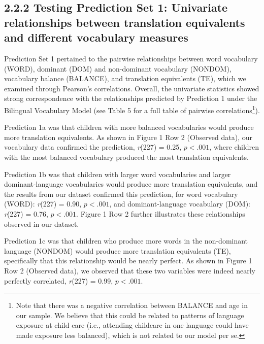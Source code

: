 \documentclass[
  english,
  ,man,floatsintext]{apa6}
\begin{document}
\hypertarget{testing-prediction-set-1-univariate-relationships-between-translation-equivalents-and-different-vocabulary-measures}{%
\subsection{2.2.2 Testing Prediction Set 1: Univariate relationships between translation equivalents and different vocabulary measures}\label{testing-prediction-set-1-univariate-relationships-between-translation-equivalents-and-different-vocabulary-measures}}

Prediction Set 1 pertained to the pairwise relationships between word vocabulary (WORD), dominant (DOM) and non-dominant vocabulary (NONDOM), vocabulary balance (BALANCE), and translation equivalents (TE), which we examined through Pearson's correlations. Overall, the univariate statistics showed strong correspondence with the relationships predicted by Prediction 1 under the Bilingual Vocabulary Model (see Table 5 for a full table of pairwise correlations\footnote{Note that there was a negative correlation between BALANCE and age in our sample. We believe that this could be related to patterns of language exposure at child care (i.e., attending childcare in one language could have made exposure less balanced), which is not related to our model per se.}).

Prediction 1a was that children with more balanced vocabularies would produce more translation equivalents. As shown in Figure 1 Row 2 (Observed data), our vocabulary data confirmed the prediction, \emph{r}(227) = 0.25, \(p < .001\), where children with the most balanced vocabulary produced the most translation equivalents.

Prediction 1b was that children with larger word vocabularies and larger dominant-language vocabularies would produce more translation equivalents, and the results from our dataset confirmed this prediction, for word vocabulary (WORD): \emph{r}(227) = 0.90, \(p < .001\), and dominant-language vocabulary (DOM): \emph{r}(227) = 0.76, \(p < .001\). Figure 1 Row 2 further illustrates these relationships observed in our dataset.

Prediction 1c was that children who produce more words in the non-dominant language (NONDOM) would produce more translation equivalents (TE), specifically that this relationship would be nearly perfect. As shown in Figure 1 Row 2 (Observed data), we observed that these two variables were indeed nearly perfectly correlated, \emph{r}(227) = 0.99, \(p < .001\).
\end{document}
